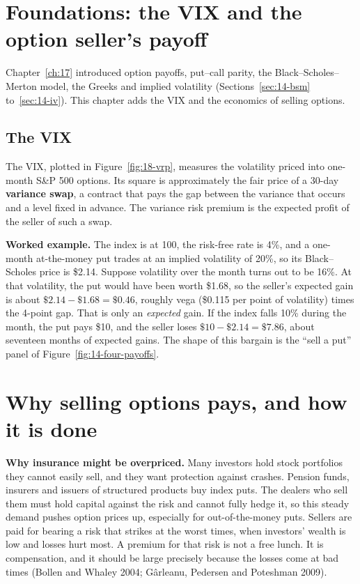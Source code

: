 \section{Foundations: the VIX and the option seller's payoff}
\label{sec:16-foundations}

Chapter~\ref{ch:17} introduced option payoffs, put--call parity, the Black--Scholes--Merton model, the Greeks and implied volatility (Sections~\ref{sec:14-bsm} to~\ref{sec:14-iv}). This chapter adds the VIX and the economics of selling options.
\subsection{The VIX}

The VIX,  plotted in Figure~\ref{fig:18-vrp}, measures the volatility priced into one-month S\&P 500 options. Its square is approximately the fair price of a 30-day \textbf{variance swap}, a contract that pays the gap between the variance that occurs and a level fixed in advance. The variance risk premium is the expected profit of the seller of such a swap.

\textbf{Worked example.} The index is at 100, the risk-free rate is 4\%, and a one-month at-the-money put trades at an implied volatility of 20\%, so its Black--Scholes price is \$2.14. Suppose volatility over the month turns out to be 16\%. At that volatility, the put would have been worth \$1.68, so the seller's expected gain is about $\$2.14 - \$1.68 = \$0.46$, roughly vega (\$0.115 per point of volatility) times the 4-point gap. That is only an \emph{expected} gain. If the index falls 10\% during the month, the put pays \$10, and the seller loses $\$10 - \$2.14 = \$7.86$, about seventeen months of expected gains. The shape of this bargain is the ``sell a put'' panel of Figure~\ref{fig:14-four-payoffs}.


\section{Why selling options pays, and how it is done}
\label{sec:16-how}

\textbf{Why insurance might be overpriced.} Many investors hold stock portfolios they cannot easily sell, and they want protection against crashes. Pension funds, insurers and issuers of structured products buy index puts. The dealers who sell them must hold capital against the risk and cannot fully hedge it, so this steady demand pushes option prices up, especially for out-of-the-money puts. Sellers are paid for bearing a risk that strikes at the worst times, when investors' wealth is low and losses hurt most. A premium for that risk is not a free lunch. It is compensation, and it should be large precisely because the losses come at bad times (Bollen and Whaley 2004; G\^arleanu, Pedersen and Poteshman 2009).


